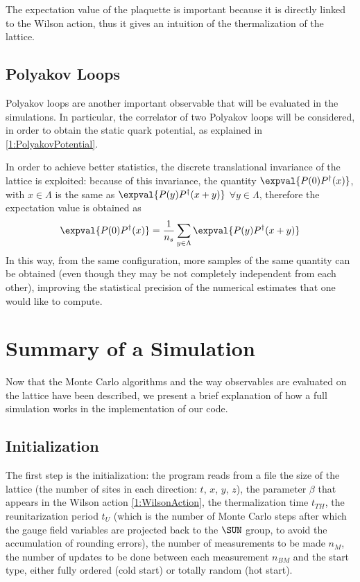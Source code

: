 The expectation value of the plaquette is important because it is directly linked to the Wilson action, thus it gives an intuition of the thermalization of the lattice.

\subsection{Polyakov Loops\label{Sec2:PolyakovLoops}}
Polyakov loops are another important observable that will be evaluated in the simulations.
In particular, the correlator of two Polyakov loops will be considered, in order to obtain the static quark potential, as explained in \eqref{1:PolyakovPotential}.

In order to achieve better statistics, the discrete translational invariance of the lattice is exploited:
because of this invariance, the quantity $\expval{P(0)P^\dagger(x)}$, with $x\in\Lambda$ is the same as $\expval{P(y)P^\dagger(x+y)}$ $\forall y\in\Lambda$, therefore the expectation value is obtained as
\begin{equation}
    \expval{P(0)P^\dagger(x)} = \frac{1}{n_s} \sum_{y\in\Lambda} \expval{P(y)P^\dagger(x+y)} \label{2:nonzeroMomPolyakov}
\end{equation}
In this way, from the same configuration, more samples of the same quantity can be obtained (even though they may be not completely independent from each other), improving the statistical precision of the numerical estimates that one would like to compute.

\section{Summary of a Simulation}
Now that the Monte Carlo algorithms and the way observables are evaluated on the lattice have been described, we present a brief explanation of how a full simulation works in the implementation of our code.

\subsection{Initialization}
The first step is the initialization: the program reads from a file the size of the lattice (the number of sites in each direction: $t$, $x$, $y$, $z$), the parameter $\beta$ that appears in the Wilson action \eqref{1:WilsonAction}, the thermalization time $t_{TH}$, the reunitarization period $t_U$ (which is the number of Monte Carlo steps after which the gauge field variables are projected back to the $\SUN$ group, to avoid the accumulation of rounding errors), the number of measurements to be made $n_M$, the number of updates to be done between each measurement $n_{BM}$ and the start type, either fully ordered (cold start) or totally random (hot start).


